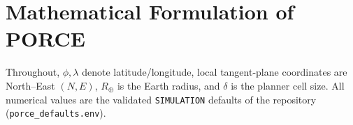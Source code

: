 
\section{Mathematical Formulation of PORCE}
\label{sec:formulation}

Throughout, $\phi,\lambda$ denote latitude/longitude, local tangent-plane
coordinates are North--East $(N,E)$, $R_\oplus$ is the Earth radius, and
$\delta$ is the planner cell size. All numerical values are the validated
\texttt{SIMULATION} defaults of the repository (\texttt{porce\_defaults.env}).


